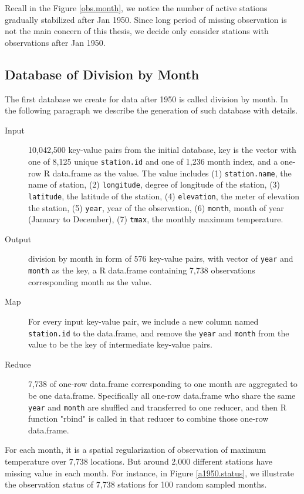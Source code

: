 Recall in the Figure \href{../plots/obs_month.pdf}{\ref*{obs.month}}, we notice
the number of active stations gradually stabilized after Jan 1950. Since long
period of missing observation is not the main concern of this thesis, we decide
only consider stations with observations after Jan 1950.

\subsection{Database of Division by Month}

The first database we create for data after 1950 is called division by month. In
the following paragraph we describe the generation of such database with details.

\begin{description}
  \item[Input] 10,042,500 key-value pairs from the initial database, key is the
  vector with one of 8,125 unique \texttt{station.id} and one of 1,236 month 
  index, and a one-row R data.frame as the value. The value includes 
  (1) \texttt{station.name}, the name of station, (2) \texttt{longitude}, degree 
  of longitude of the station, (3) \texttt{latitude}, the latitude of the station, 
  (4) \texttt{elevation}, the meter of elevation the station, (5) \texttt{year}, 
  year of the observation, (6) \texttt{month}, month of year (January to 
  December), (7) \texttt{tmax}, the monthly maximum temperature.
  \item[Output] division by month in form of 576 key-value pairs, with vector of
  \texttt{year} and \texttt{month} as the key, a R data.frame containing 7,738 
  observations corresponding month as the value.
  \item[Map]For every input key-value pair, we include a new column named 
  \texttt{station.id} to the data.frame, and remove the \texttt{year} and 
  \texttt{month} from the value to be the key of intermediate key-value pairs. 
  \item[Reduce] 7,738 of one-row data.frame corresponding to one month are 
  aggregated to be one data.frame. Specifically all one-row data.frame who share
  the same \texttt{year} and \texttt{month} are shuffled and transferred to one 
  reducer, and then R function "rbind" is called in that reducer to combine those 
  one-row data.frame.
\end{description}


For each month, it is a spatial regularization of observation of maximum temperature 
over 7,738 locations. But around 2,000 different stations have missing value in 
each month. For instance, in Figure 
\href{../plots/tmax.a1950.status.pdf}{\ref*{a1950.status}},
we illustrate the observation status of 7,738 stations for 100 random sampled 
months.

